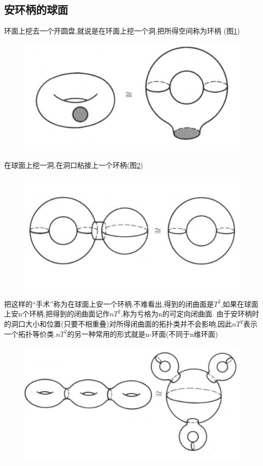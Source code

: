 \subsection*{安环柄的球面}
环面上挖去一个开圆盘,就说是在环面上挖一个洞,把所得空间称为环柄 (图\ref{fig:enter-label_10})
\begin{figure}[H]
    \centering
    \includegraphics[width=0.5\linewidth]{image_10.png}
    \caption{}
    \label{fig:enter-label_10}
\end{figure}
在球面上挖一洞,在洞口粘接上一个环柄(图\ref{fig:enter-label_11})
\begin{figure}[H]
    \centering
    \includegraphics[width=0.5\linewidth]{image_11.png}
    \caption{}
    \label{fig:enter-label_11}
\end{figure}
把这样的“手术”称为在球面上安一个环柄.不难看出,得到的闭曲面是\(T^2\),如果在球面上安n个环柄,把得到的闭曲面记作\(nT^2\),称为亏格为n的可定向闭曲面. 由于安环柄时的洞口大小和位置(只要不相重叠)对所得闭曲面的拓扑类并不会影响,因此\(nT^2\)表示一个拓扑等价类.\(nT^2\)的另一种常用的形式就是n-环面(不同于n维环面)
\begin{figure}[H]
    \centering
    \includegraphics[width=0.5\linewidth]{image_12.png}
    \caption{}
    \label{fig:enter-label_!2}
\end{figure}
